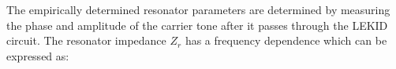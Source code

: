 The empirically determined resonator parameters are determined by measuring the phase and amplitude of the carrier tone after it passes through the LEKID circuit. The resonator impedance  $Z_{r}$ has a frequency dependence which can be expressed as:


